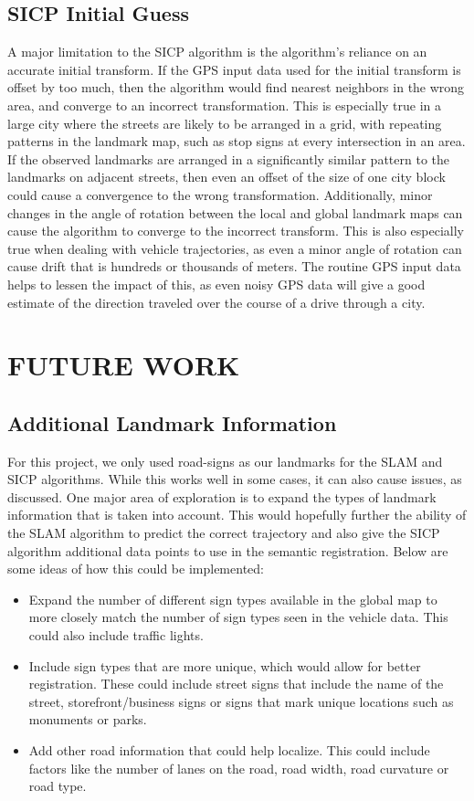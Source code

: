 \documentclass[letterpaper, 10 pt, conference]{ieeeconf}  %
\begin{document}
\subsection{SICP Initial Guess}

A major limitation to the SICP algorithm is the algorithm's reliance on an accurate initial transform. If the GPS input data used for the initial transform is offset by too much, then the algorithm would find nearest neighbors in the wrong area, and converge to an incorrect transformation. This is especially true in a large city where the streets are likely to be arranged in a grid, with repeating patterns in the landmark map, such as stop signs at every intersection in an area. If the observed landmarks are arranged in a significantly similar pattern to the landmarks on adjacent streets, then even an offset of the size of one city block could cause a convergence to the wrong transformation. Additionally, minor changes in the angle of rotation between the local and global landmark maps can cause the algorithm to converge to the incorrect transform. This is also especially true when dealing with vehicle trajectories, as even a minor angle of rotation can cause drift that is hundreds or thousands of meters. The routine GPS input data helps to lessen the impact of this, as even noisy GPS data will give a good estimate of the direction traveled over the course of a drive through a city. 

\section{FUTURE WORK}

\subsection{Additional Landmark Information}
For this project, we only used road-signs as our landmarks for the SLAM and SICP algorithms. While this works well in some cases, it can also cause issues, as discussed. One major area of exploration is to expand the types of landmark information that is taken into account. This would hopefully further the ability of the SLAM algorithm to predict the correct trajectory and also give the SICP algorithm additional data points to use in the semantic registration. Below are some ideas of how this could be implemented:

\begin{itemize}
\item Expand the number of different sign types available in the global map to more closely match the number of sign types seen in the vehicle data. This could also include traffic lights.
\item Include sign types that are more unique, which would allow for better registration. These could include street signs that include the name of the street, storefront/business signs or signs that mark unique locations such as monuments or parks.
\item Add other road information that could help localize. This could include factors like the number of lanes on the road, road width, road curvature or road type.
\end{itemize}
\end{document}
